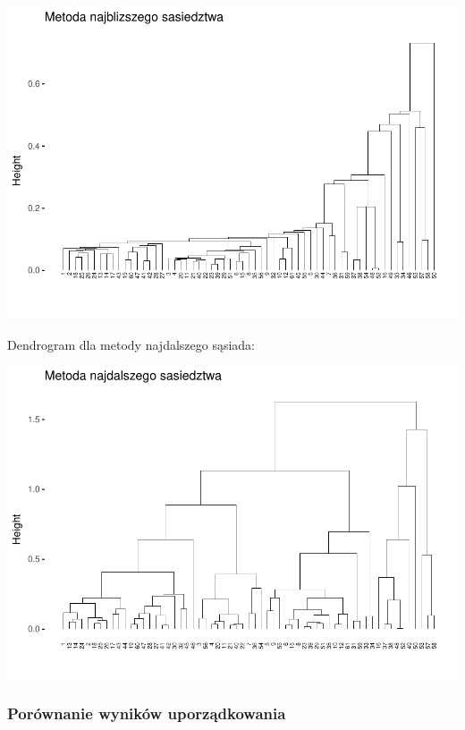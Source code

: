 \documentclass[12pt,a4paper]{report}
\begin{document}
{\includegraphics{Metoda_nieliniowa_duzy_files/figure-latex/unnamed-chunk-9-1.pdf}

Dendrogram dla metody najdalszego sąsiada:

\begin{Shaded}
\begin{Highlighting}[]
\NormalTok{, }\NormalTok{, }
 \NormalTok{)}
\end{Highlighting}
\end{Shaded}

\includegraphics{Metoda_nieliniowa_duzy_files/figure-latex/unnamed-chunk-10-1.pdf}

\subsubsection{Porównanie wyników
uporządkowania}\label{porownanie-wynikow-uporzadkowania}

}
\end{document}
